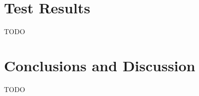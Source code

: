 \documentclass[a4,11pt]{scrartcl}
\begin{document}
\section{Test Results}\label{results}
TODO


\section{Conclusions and Discussion}\label{conclusion}
TODO
\end{document}
